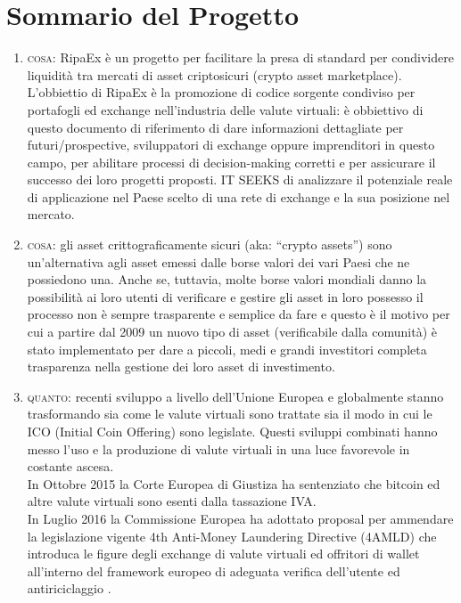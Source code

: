 \documentclass[11pt,fleqn,oneside]{book} %
\begin{document}
\section{Sommario del Progetto}
\begin{enumerate}
	\item \textsc{cosa}: RipaEx è un progetto per facilitare la presa di standard per condividere liquidità tra mercati di asset
	criptosicuri (crypto asset marketplace).
	L'obbiettio di RipaEx è la promozione di codice sorgente condiviso per portafogli ed exchange nell'industria delle valute
	virtuali: è obbiettivo di questo documento di riferimento di dare informazioni dettagliate per futuri/prospective,
	sviluppatori di exchange oppure imprenditori in questo campo, per abilitare processi di decision-making corretti e per 
	assicurare il successo dei loro progetti proposti.
	IT SEEKS di analizzare il potenziale reale di applicazione nel Paese scelto di una rete di exchange e la sua posizione nel mercato.
	\item \textsc{cosa}: gli asset crittograficamente sicuri (aka: ``crypto assets'') sono un'alternativa agli asset emessi dalle borse
	valori dei vari Paesi che ne possiedono una. Anche se, tuttavia, molte borse valori mondiali danno la possibilità ai loro 
	utenti di verificare e gestire gli asset in loro possesso il processo non è sempre trasparente e semplice da fare e questo è il motivo 
	per cui a partire dal 2009 \cite{bitcoin} un nuovo tipo di asset (verificabile dalla comunità) è stato implementato
	per dare a piccoli, medi e grandi investitori completa trasparenza nella gestione dei loro asset di investimento.
	\item \textsc{quanto}: recenti sviluppo a livello dell'Unione Europea e globalmente stanno trasformando sia come le valute virtuali
	sono trattate sia il modo in cui le ICO (Initial Coin Offering) sono legislate. Questi sviluppi combinati hanno messo
	l'uso e la produzione di valute virtuali in una luce favorevole in costante ascesa. \\
	In Ottobre 2015 la Corte Europea di Giustiza ha sentenziato che bitcoin ed altre valute virtuali sono esenti dalla tassazione IVA. \\
	In Luglio 2016 la Commissione Europea ha adottato proposal per ammendare la legislazione vigente 4th Anti-Money Laundering Directive (4AMLD) 
	che introduca le figure degli exchange di valute virtuali ed offritori di wallet all'interno del framework europeo di adeguata verifica
	dell'utente ed antiriciclaggio \cite{EUAMLCrypto}.\\

\end{enumerate}
\end{document}
